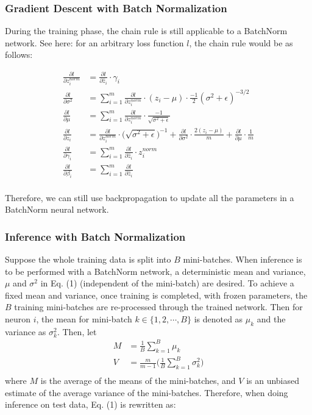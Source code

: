 \documentclass{article}
\begin{document}
\subsubsection{Gradient Descent with Batch Normalization}

During the training phase, the chain rule is still applicable to a BatchNorm network. See here: for an arbitrary loss function $l$, the chain rule would be as follows:

\begin{align*}
   \frac{\partial l}{\partial z_i^{norm}} &= \frac{\partial l}{\partial \hat{z}_i}\cdot\gamma_i\\
   \frac{\partial l}{\partial \sigma^2}  &= \sum_{i=1}^m\frac{\partial l}{\partial z_i^{norm}}\cdot(z_i-\mu)\cdot\frac{-1}{2}(\sigma^2+\epsilon)^{-3/2} \\
   \frac{\partial l}{\partial \mu}  &= \sum_{i=1}^m\frac{\partial l}{\partial z_i^{norm}}\cdot \frac{-1}{\sqrt{\sigma^2+\epsilon}}\\
   \frac{\partial l}{\partial z_i}  &=  \frac{\partial l}{\partial z_i^{norm}} \cdot\bigg(\sqrt{\sigma^2+\epsilon}\bigg)^{-1} + \frac{\partial l}{\partial \sigma^2}\cdot\frac{2(z_i-\mu)}{m} +  \frac{\partial l}{\partial \mu}\cdot\frac{1}{m}\\
   \frac{\partial l}{\partial \gamma_i}  &=  \sum_{i=1}^m\frac{\partial l}{\partial \hat{z}_i}\cdot z_i^{norm} \\
   \frac{\partial l}{\partial \beta_i}  &= \sum_{i=1}^m\frac{\partial l}{\partial \hat{z}_i} \\
\end{align*}

Therefore, we can still use backpropagation to update all the parameters in a BatchNorm neural network.

\subsubsection{Inference with Batch Normalization}

Suppose the whole training data is split into $B$ mini-batches. When inference is to be performed with a BatchNorm network, a deterministic mean and variance, $\mu$ and $\sigma^2$ in Eq. (1) (independent of the mini-batch) are desired. To achieve a fixed mean and variance, once training is completed, with frozen parameters, the $B$ training mini-batches are re-processed through the trained network. Then for neuron $i$, the mean for mini-batch $k\in\{1,2,\cdots,B\}$ is denoted as $\mu_k$ and the variance as $\sigma^2_k$. Then, let
\begin{align*}
   M &= \frac{1}{B}\sum_{k=1}^B\mu_k\\
   V &= \frac{m}{m-1}\Bigg(\frac{1}{B}\sum_{k=1}^B\sigma^2_k\Bigg)\\
\end{align*}
where $M$ is the average of the means of the mini-batches, and $V$ is an unbiased estimate of the average variance of the mini-batches. Therefore, when doing inference on test data, Eq. (1) is rewritten as:
\end{document}
